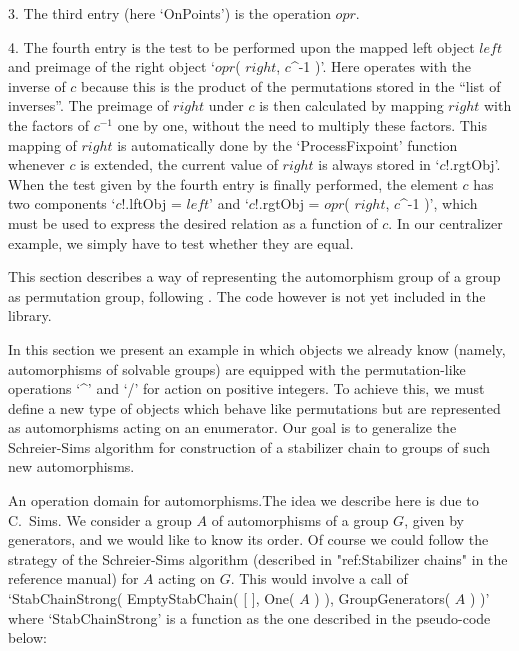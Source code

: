 \item{3.}
The third entry (here `OnPoints') is the operation $opr$.

\item{4.}
The fourth entry is the test to be performed upon the mapped left  object
$left$ and preimage of the right object `$opr$( $right$, $c$^-1 )'.  Here
{\GAP} operates with the inverse of $c$ because this is  the  product  of
the permutations stored in the ``list  of  inverses''.  The  preimage  of
$right$ under $c$ is then calculated by mapping $right$ with the  factors
of $c^{-1}$ one by one, without the need to multiply these factors.  This
mapping  of  $right$  is  automatically  done  by  the  `ProcessFixpoint'
function whenever $c$ is extended, the current value of $right$ is always
stored in `$c$!.rgtObj'. When the test  given  by  the  fourth  entry  is
finally performed, the element $c$  has  two  components  `$c$!.lftObj  =
$left$' and `$c$!.rgtObj = $opr$( $right$, $c$^-1 )', which must be  used
to express the desired relation as a function of $c$. In our  centralizer
example, we simply have to test whether they are equal.

\endlist

\endgroup%


This section describes a way of representing the automorphism group of a
group as permutation group, following \cite{Sims97}. The code however is
not yet included in the {\GAP} library.

In this section  we present an example in  which objects we  already know
(namely,  automorphisms  of   solvable  groups)   are  equipped  with the
permutation-like operations `^' and `/'  for action on positive integers.
To achieve this, we must  define a new  type of objects which behave like
permutations   but are  represented     as automorphisms  acting  on   an
enumerator.  Our  goal is to  generalize  the Schreier-Sims algorithm for
construction of a stabilizer chain to groups of such new automorphisms.

{\bsf  An operation domain for automorphisms.}\quad  The idea we describe
here is due  to C.~Sims. We consider  a group $A$  of  automorphisms of a
group $G$, given by generators,  and we would like  to know its order. Of
course we  could   follow the strategy  of  the   Schreier-Sims algorithm
(described  in "ref:Stabilizer chains"  in  the reference manual) for $A$
acting   on   $G$. This would    involve   a  call  of  `StabChainStrong(
EmptyStabChain( [   ],  One( $A$ ) ),   GroupGenerators(  $A$ ) )'  where
`StabChainStrong'  is a function as the  one described in the pseudo-code
below:

